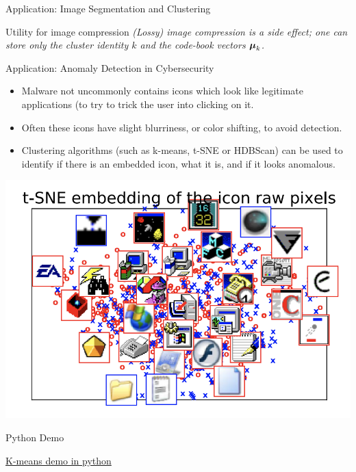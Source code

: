 \documentclass[10pt]{beamer}
\begin{document}
\begin{frame}{Application: Image Segmentation and Clustering}
\begin{sblock}{Utility for image compression}
\it{(Lossy) image compression} is a side effect; one can store only the cluster identity $k$ and the \it{code-book vectors} ${\boldsymbol \mu}_k$.
\end{sblock}

\end{frame}


\begin{frame}{Application: Anomaly Detection in Cybersecurity}

\begin{itemize}
\item Malware not uncommonly contains icons which look like legitimate applications (to try to trick the user into clicking on it.
\item Often these icons have slight blurriness, or color shifting, to avoid detection. 
\item Clustering algorithms (such as k-means,  t-SNE or HDBScan) can be used to identify if there is an embedded icon, what it is, and if it looks anomalous.
\end{itemize}
\begin{center}
\includegraphics[width=.5\textwidth]{images/malware_icons}
\end{center}

\end{frame}

\begin{frame}{Python Demo}
\begin{center}
\href{https://github.com/JWarmenhoven/Coursera-Machine-Learning/blob/master/notebooks/Programming\%20Exercise\%207\%20-\%20K-means\%20Clustering\%20and\%20Principal\%20Component\%20Analysis.ipynb}{K-means demo in python}
\end{center}
\end{frame}
\end{document}
